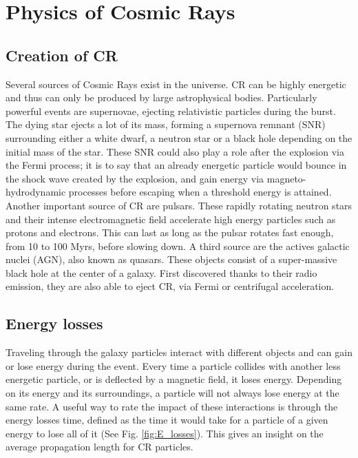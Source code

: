 \newpage
\section{Physics of Cosmic Rays}

\subsection{Creation of CR}
\label{sec:creation_of_CRs}

Several sources of Cosmic Rays exist in the universe. CR can be highly energetic and thus can only be produced by large astrophysical bodies. Particularly powerful events are supernovae, ejecting relativistic particles during the burst. The dying star ejects a lot of its mass, forming a supernova remnant (SNR) surrounding either a white dwarf, a neutron star or a black hole depending on the initial mass of the star. These SNR could also play a role after the explosion via the Fermi process; it is to say that an already energetic particle would bounce in the shock wave created by the explosion, and gain energy via magneto-hydrodynamic processes before escaping when a threshold energy is attained. \cite{Wu1984}
Another important source of CR are pulsars. These rapidly rotating neutron stars and their intense electromagnetic field accelerate high energy particles such as protons and electrons. This can last as long as the pulsar rotates fast enough, from 10 to 100 Myrs, before slowing down.
A third source are the actives galactic nuclei (AGN), also known as quasars. These objects consist of a super-massive black hole at the center of a galaxy. First discovered thanks to their radio emission, they are also able to eject CR, via Fermi or centrifugal acceleration.


\subsection{Energy losses}

Traveling through the galaxy particles interact with different objects and can gain or lose energy during the event. Every time a particle collides with another less energetic particle, or is deflected by a magnetic field, it loses energy. Depending on its energy and its surroundings, a particle will not always lose energy at the same rate. A useful way to rate the impact of these interactions is through the energy losses time, defined as the time it would take for a particle of a given energy to lose all of it (See Fig. \ref{fig:E_losses}). This gives an insight on the average propagation length for CR particles.

